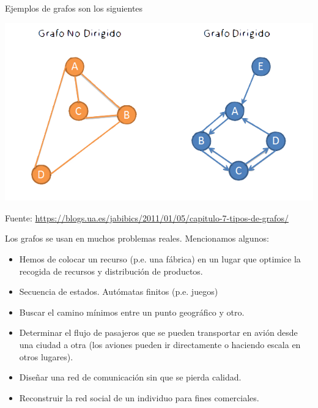\begin{ejemplo}
Ejemplos de grafos son los siguientes

\centerline{\includegraphics[width=.6\textwidth]{input/06-Graph-fig/grafos1}}

Fuente: \url{https://blogs.ua.es/jabibics/2011/01/05/capitulo-7-tipos-de-grafos/}
\end{ejemplo}

Los grafos se usan en muchos problemas reales. Mencionamos algunos:
\begin{itemize}
\item Hemos de colocar un recurso (p.e. una fábrica) en un lugar que optimice la recogida de recursos y distribución de productos.

\item Secuencia de estados. Autómatas finitos (p.e. juegos)

\item Buscar el camino mínimos entre un punto geográfico y otro.

\item Determinar el flujo de pasajeros que se pueden transportar en avión desde una ciudad a otra (los aviones pueden ir directamente o haciendo escala en otros lugares).

\item Diseñar una red de comunicación sin que se pierda calidad.

\item Reconstruir la red social de un individuo para fines comerciales.
\end{itemize}


